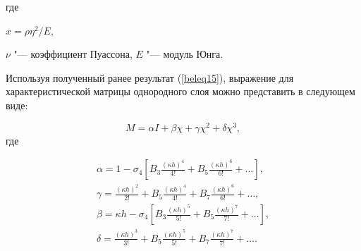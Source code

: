 \begin{example}
где

$x={\rho\eta^2}/{E},$	

$\nu$ "--- коэффициент Пуассона, $E$ "--- модуль Юнга.



Используя полученный ранее результат (\ref{beleq15}), выражение для характеристической матрицы однородного слоя можно представить в следующем виде:

$$M=\alpha{I}+\beta\chi+\gamma\chi^2+\delta\chi^3,

$$ где

\begin{equation}

\label{beleq20}

	\begin{array}{l}

\displaystyle\alpha=1 - \sigma_4\!\displaystyle\left[\!B_3\frac{(\kappa h)^4}{4!} + B_5\frac{(\kappa h)^6}{6!} +  \dots \right],\\

\displaystyle\gamma=\displaystyle\frac{(\kappa h)^2}{2!} + B_5\frac{(\kappa h)^4}{4!} + B_7\frac{(\kappa h)^6}{6!}+ \dots ,\\

\displaystyle\beta=\kappa h - \sigma_4\!\left[\!B_3\frac{(\kappa h)^5}{5!} + B_5\frac{(\kappa h)^7}{7!} +  \dots \right],\\

\displaystyle\delta=\frac{(\kappa h)^3}{3!} + B_5\frac{(\kappa h)^5}{5!} + B_7\frac{(\kappa h)^7}{7!} +  \dots .\\

\end{array}

\end{equation}






\end{example}
